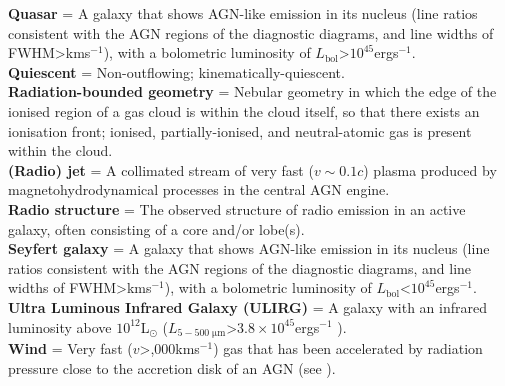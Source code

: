 \noindent
\textbf{Quasar} = A galaxy that shows AGN-like emission in its nucleus (line ratios consistent with the AGN regions of the \citealt{Baldwin1981} diagnostic diagrams, and line widths of FWHM\;\textgreater{}\;km\;s$^{-1}$), with a bolometric luminosity of $L_\mathrm{bol}$\;\textgreater\;$10^{45}$\;erg\;s$^{-1}$. \\

\noindent
\textbf{Quiescent} = Non-outflowing; kinematically-quiescent. \\

\noindent
\textbf{Radiation-bounded geometry} = Nebular geometry in which the edge of the ionised region of a gas cloud is within the cloud itself, so that there exists an ionisation front; ionised, partially-ionised, and neutral-atomic gas is present within the cloud. \\

\noindent
\textbf{(Radio) jet} = A collimated stream of very fast ($v\sim0.1c$) plasma produced by magnetohydrodynamical processes in the central AGN engine. \\

\noindent
\textbf{Radio structure} = The observed structure of radio emission in an active galaxy, often consisting of a core and/or lobe(s). \\

\noindent
\textbf{Seyfert galaxy} = A galaxy that shows AGN-like emission in its nucleus (line ratios consistent with the AGN regions of the \citealt{Baldwin1981} diagnostic diagrams, and line widths of FWHM\;\textgreater{}\;km\;s$^{-1}$), with a bolometric luminosity of $L_\mathrm{bol}$\;\textless\;$10^{45}$\;erg\;s$^{-1}$. \\


\noindent
\textbf{Ultra Luminous Infrared Galaxy (ULIRG)} = A galaxy with an infrared luminosity above $10^{12}$\;L$_\odot$ ($L_\mathrm{5-500\;\mu{m}}$\;\textgreater\;$3.8\times10^{45}$\;erg\;s$^{-1}$ \citealt{Sanders1996}). \\

\noindent
\textbf{Wind} = Very fast ($v$\;\textgreater{},000\;km\;s$^{-1}$) gas that has been accelerated by radiation pressure close to the accretion disk of an AGN (see \citealt{Hopkins2010}).
